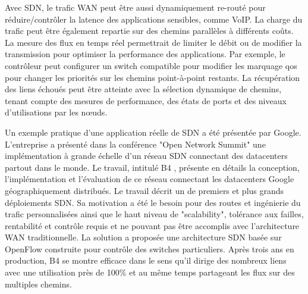 Avec SDN, le trafic WAN peut être aussi dynamiquement re-routé pour réduire/contrôler la latence des applications sensibles, comme VoIP. La charge du trafic peut être également repartie sur des chemins parallèles à différents coûts.
La mesure des flux en temps réel permettrait de limiter le débit ou de modifier la transmission pour optimiser la performance des applications. Par exemple, le contrôleur peut configurer un switch compatible pour modifier les marquage \gls{qos} pour changer les priorités sur les chemins point-à-point restants.
La récupération des liens échoués peut être atteinte avec la sélection dynamique de chemins, tenant compte des mesures de performance, des états de ports et des niveaux d'utilisations par les nœuds.

Un exemple pratique d'une application réelle de SDN a été présentée par Google. L'entreprise a présenté dans la conférence "Open Network Summit" \cite{googleONS} une implémentation à grande échelle d'un réseau SDN connectant des \glspl{datacenter} partout dans le monde. Le travail, intitulé B4 \cite{SDNWANB4}, présente en détails la conception, l'implémentation et l'évaluation de ce réseau connectant les \glspl{datacenter} Google géographiquement distribués. Le travail décrit un de premiers et plus grands déploiements SDN. Sa motivation a été le besoin pour des routes et ingénierie du trafic personnalisées ainsi que le haut niveau de "scalability", tolérance aux failles, rentabilité et contrôle requis et ne pouvant pas être accomplis avec l'architecture WAN traditionnelle. La solution a proposée une architecture SDN basée sur OpenFlow construite pour contrôle des switches particuliers. Après trois ans en production, B4 se montre efficace dans le sens qu'il dirige des nombreux liens avec une utilisation près de 100\% et au même temps partageant les flux sur des multiples chemins. \cite{SurveySDNApplications}


